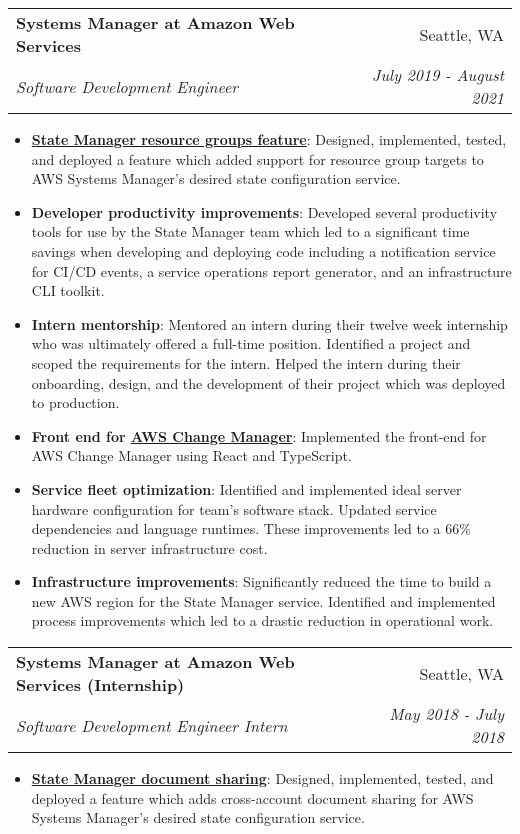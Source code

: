 \documentclass[letterpaper,11pt]{article}
\makeatletter
\newcommand{\resumeItem}[2]{
  \item\small{
    \textbf{#1}{: #2 \vspace{-2pt}}
  }
}
\newcommand{\resumeSubheading}[4]{
  \vspace{-1pt}\item
    \begin{tabular*}{0.97\textwidth}[t]{l@{\extracolsep{\fill}}r}
      \textbf{#1} & #2 \\
      \textit{\small#3} & \textit{\small #4} \\
    \end{tabular*}\vspace{-5pt}
}
\newcommand{\resumeItemListStart}{\begin{itemize}}
\newcommand{\resumeItemListEnd}{\end{itemize}\vspace{-5pt}}
\makeatother
\begin{document}
    \resumeSubheading
      {Systems Manager at Amazon Web Services}{Seattle, WA}
      {Software Development Engineer}{July 2019 - August 2021}
      \resumeItemListStart
        \resumeItem{\href{https://aws.amazon.com/about-aws/whats-new/2020/05/aws-systems-manager-now-supports-resource-groups-as-targets-for-state-manager/}{State Manager resource groups feature}}
          {Designed, implemented, tested, and deployed a feature which added support for resource group targets to AWS Systems Manager's desired state configuration service.}
        \resumeItem{Developer productivity improvements}{Developed several productivity tools for use by the State Manager team which led to a significant time savings when developing and deploying code including a notification service for CI/CD events, a service operations report generator, and an infrastructure CLI toolkit.}
        \resumeItem{Intern mentorship}{Mentored an intern during their twelve week internship who was ultimately offered a full-time position. Identified a project and scoped the requirements for the intern. Helped the intern during their onboarding, design, and the development of their project which was deployed to production.}
        \resumeItem{Front end for \href{https://docs.aws.amazon.com/systems-manager/latest/userguide/change-manager.html}{AWS Change Manager}}{Implemented the front-end for AWS Change Manager using React and TypeScript.}
        \resumeItem{Service fleet optimization}
          {Identified and implemented ideal server hardware configuration for team's software stack. Updated service dependencies and language runtimes. These improvements led to a 66\% reduction in server infrastructure cost.}
        \resumeItem{Infrastructure improvements}{Significantly reduced the time to build a new AWS region for the State Manager service. Identified and implemented process improvements which led to a drastic reduction in operational work.}
        \resumeItemListEnd

    \resumeSubheading
      {Systems Manager at Amazon Web Services (Internship)}{Seattle, WA}
      {Software Development Engineer Intern}{May 2018 - July 2018}
      \resumeItemListStart
        \resumeItem{\href{https://aws.amazon.com/about-aws/whats-new/2019/02/aws-systems-manager-state-manager-enables-document-sharing-across-accounts/}{State Manager document sharing}}
          {Designed, implemented, tested, and deployed a feature which adds cross-account document sharing for AWS Systems Manager's desired state configuration  service.}
      \resumeItemListEnd
\end{document}
